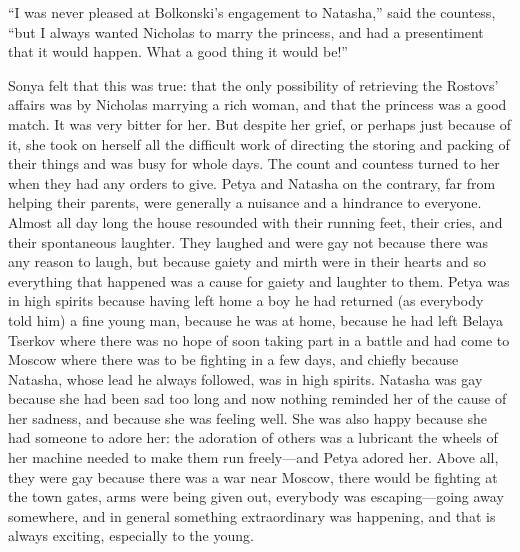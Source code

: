 ``I was never pleased at Bolkonski's engagement to Natasha,''
said the countess, ``but I always wanted Nicholas to marry the
princess, and had a presentiment that it would happen. What a
good thing it would be!''

Sonya felt that this was true: that the only possibility of
retrieving the Rostovs' affairs was by Nicholas marrying a rich
woman, and that the princess was a good match. It was very bitter
for her. But despite her grief, or perhaps just because of it,
she took on herself all the difficult work of directing the
storing and packing of their things and was busy for whole
days. The count and countess turned to her when they had any
orders to give. Petya and Natasha on the contrary, far from
helping their parents, were generally a nuisance and a hindrance
to everyone. Almost all day long the house resounded with their
running feet, their cries, and their spontaneous laughter. They
laughed and were gay not because there was any reason to laugh,
but because gaiety and mirth were in their hearts and so
everything that happened was a cause for gaiety and laughter to
them. Petya was in high spirits because having left home a boy he
had returned (as everybody told him) a fine young man, because he
was at home, because he had left Belaya Tserkov where there was
no hope of soon taking part in a battle and had come to Moscow
where there was to be fighting in a few days, and chiefly because
Natasha, whose lead he always followed, was in high
spirits. Natasha was gay because she had been sad too long and
now nothing reminded her of the cause of her sadness, and because
she was feeling well. She was also happy because she had someone
to adore her: the adoration of others was a lubricant the wheels
of her machine needed to make them run freely---and Petya adored
her. Above all, they were gay because there was a war near
Moscow, there would be fighting at the town gates, arms were
being given out, everybody was escaping---going away somewhere,
and in general something extraordinary was happening, and that is
always exciting, especially to the young.


